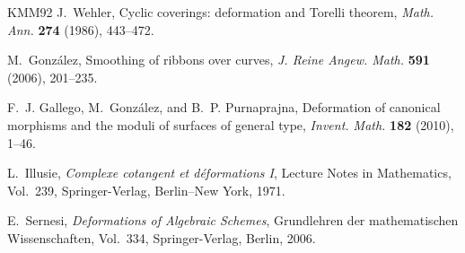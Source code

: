 \documentclass[11pt,twoside]{amsart}
\theoremstyle{plain}
\numberwithin{equation}{section}
\theoremstyle{definition}
\begin{document}
\begin{thebibliography}{KMM92}
J.~Wehler,
\newblock Cyclic coverings: deformation and Torelli theorem,
\newblock \emph{Math. Ann.} \textbf{274} (1986), 443--472.

M.~Gonz\'alez,
\newblock Smoothing of ribbons over curves,
\newblock \emph{J. Reine Angew. Math.} \textbf{591} (2006), 201--235.

F.~J. Gallego, M.~Gonz\'alez, and B.~P. Purnaprajna,
\newblock Deformation of canonical morphisms and the moduli of surfaces of general type,
\newblock \emph{Invent. Math.} \textbf{182} (2010), 1--46.

L.~Illusie,
\newblock \emph{Complexe cotangent et d\'eformations I},
\newblock Lecture Notes in Mathematics, Vol.~239,
\newblock Springer-Verlag, Berlin--New York, 1971.

E.~Sernesi,
\newblock \emph{Deformations of Algebraic Schemes},
\newblock Grundlehren der mathematischen Wissenschaften, Vol.~334,
\newblock Springer-Verlag, Berlin, 2006.




 
\end{thebibliography}
\end{document}
